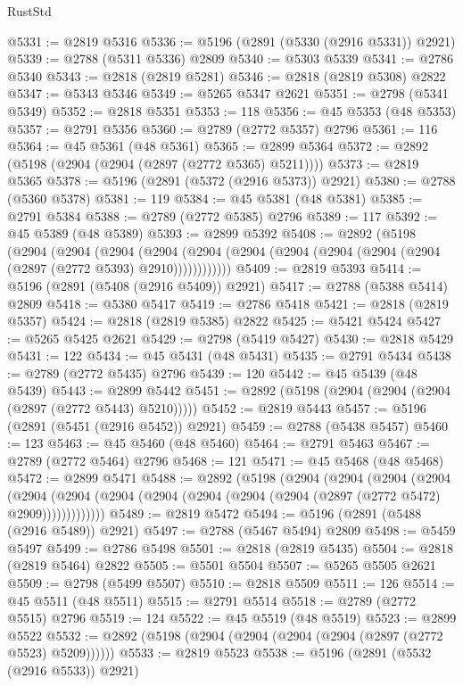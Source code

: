 \begin{lexlean}{RustStd}
\begin{coremodule}
@5331 := @2819 @5316
@5336 := @5196 (@2891 (@5330 (@2916 @5331)) @2921)
@5339 := @2788 (@5311 @5336) @2809
@5340 := @5303 @5339
@5341 := @2786 @5340
@5343 := @2818 (@2819 @5281)
@5346 := @2818 (@2819 @5308) @2822
@5347 := @5343 @5346
@5349 := @5265 @5347 @2621
@5351 := @2798 (@5341 @5349)
@5352 := @2818 @5351
@5353 := 118
@5356 := @45 @5353 (@48 @5353)
@5357 := @2791 @5356
@5360 := @2789 (@2772 @5357) @2796
@5361 := 116
@5364 := @45 @5361 (@48 @5361)
@5365 := @2899 @5364
@5372 := @2892 (@5198 (@2904 (@2904 (@2897 (@2772 @5365) @5211))))
@5373 := @2819 @5365
@5378 := @5196 (@2891 (@5372 (@2916 @5373)) @2921)
@5380 := @2788 (@5360 @5378)
@5381 := 119
@5384 := @45 @5381 (@48 @5381)
@5385 := @2791 @5384
@5388 := @2789 (@2772 @5385) @2796
@5389 := 117
@5392 := @45 @5389 (@48 @5389)
@5393 := @2899 @5392
@5408 := @2892
    (@5198
      (@2904
        (@2904
          (@2904
            (@2904 (@2904 (@2904 (@2904 (@2904 (@2904 (@2904 (@2897 (@2772 @5393) @2910))))))))))))
@5409 := @2819 @5393
@5414 := @5196 (@2891 (@5408 (@2916 @5409)) @2921)
@5417 := @2788 (@5388 @5414) @2809
@5418 := @5380 @5417
@5419 := @2786 @5418
@5421 := @2818 (@2819 @5357)
@5424 := @2818 (@2819 @5385) @2822
@5425 := @5421 @5424
@5427 := @5265 @5425 @2621
@5429 := @2798 (@5419 @5427)
@5430 := @2818 @5429
@5431 := 122
@5434 := @45 @5431 (@48 @5431)
@5435 := @2791 @5434
@5438 := @2789 (@2772 @5435) @2796
@5439 := 120
@5442 := @45 @5439 (@48 @5439)
@5443 := @2899 @5442
@5451 := @2892 (@5198 (@2904 (@2904 (@2904 (@2897 (@2772 @5443) @5210)))))
@5452 := @2819 @5443
@5457 := @5196 (@2891 (@5451 (@2916 @5452)) @2921)
@5459 := @2788 (@5438 @5457)
@5460 := 123
@5463 := @45 @5460 (@48 @5460)
@5464 := @2791 @5463
@5467 := @2789 (@2772 @5464) @2796
@5468 := 121
@5471 := @45 @5468 (@48 @5468)
@5472 := @2899 @5471
@5488 := @2892
    (@5198
      (@2904
        (@2904
          (@2904
            (@2904
              (@2904
                (@2904 (@2904 (@2904 (@2904 (@2904 (@2904 (@2897 (@2772 @5472) @2909)))))))))))))
@5489 := @2819 @5472
@5494 := @5196 (@2891 (@5488 (@2916 @5489)) @2921)
@5497 := @2788 (@5467 @5494) @2809
@5498 := @5459 @5497
@5499 := @2786 @5498
@5501 := @2818 (@2819 @5435)
@5504 := @2818 (@2819 @5464) @2822
@5505 := @5501 @5504
@5507 := @5265 @5505 @2621
@5509 := @2798 (@5499 @5507)
@5510 := @2818 @5509
@5511 := 126
@5514 := @45 @5511 (@48 @5511)
@5515 := @2791 @5514
@5518 := @2789 (@2772 @5515) @2796
@5519 := 124
@5522 := @45 @5519 (@48 @5519)
@5523 := @2899 @5522
@5532 := @2892 (@5198 (@2904 (@2904 (@2904 (@2904 (@2897 (@2772 @5523) @5209))))))
@5533 := @2819 @5523
@5538 := @5196 (@2891 (@5532 (@2916 @5533)) @2921)

\end{coremodule}
\end{lexlean}
